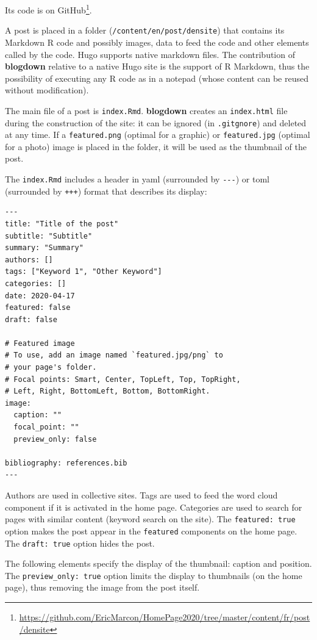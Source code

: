 \documentclass[
  12pt,
  american,
  a4paper,
  extrafontsizes,onecolumn,openright
  ]{memoir}
\begin{document}
Its code is on GitHub\footnote{\url{https://github.com/EricMarcon/HomePage2020/tree/master/content/fr/post/densite}}.

A post is placed in a folder (\texttt{/content/en/post/densite}) that contains its Markdown R code and possibly images, data to feed the code and other elements called by the code.
Hugo supports native markdown files.
The contribution of \textbf{blogdown} relative to a native Hugo site is the support of R Markdown, thus the possibility of executing any R code as in a notepad (whose content can be reused without modification).

The main file of a post is \texttt{index.Rmd}.
\textbf{blogdown} creates an \texttt{index.html} file during the construction of the site: it can be ignored (in \texttt{.gitgnore}) and deleted at any time.
If a \texttt{featured.png} (optimal for a graphic) or \texttt{featured.jpg} (optimal for a photo) image is placed in the folder, it will be used as the thumbnail of the post.

The \texttt{index.Rmd} includes a header in yaml (surrounded by \texttt{-\/-\/-}) or toml (surrounded by \texttt{+++}) format that describes its display:

\begin{verbatim}
---
title: "Title of the post"
subtitle: "Subtitle"
summary: "Summary"
authors: []
tags: ["Keyword 1", "Other Keyword"]
categories: []
date: 2020-04-17
featured: false
draft: false

# Featured image
# To use, add an image named `featured.jpg/png` to 
# your page's folder.
# Focal points: Smart, Center, TopLeft, Top, TopRight,
# Left, Right, BottomLeft, Bottom, BottomRight.
image:
  caption: ""
  focal_point: ""
  preview_only: false
  
bibliography: references.bib
---
\end{verbatim}

Authors are used in collective sites.
Tags are used to feed the word cloud component if it is activated in the home page.
Categories are used to search for pages with similar content (keyword search on the site).
The \texttt{featured:\ true} option makes the post appear in the \texttt{featured} components on the home page.
The \texttt{draft:\ true} option hides the post.

The following elements specify the display of the thumbnail: caption and position.
The \texttt{preview\_only:\ true} option limits the display to thumbnails (on the home page), thus removing the image from the post itself.
\end{document}
